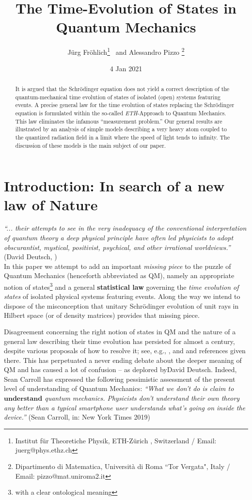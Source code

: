 \documentclass[12pt]{article}
\date{4 Jan 2021}
\author{J\"{u}rg Fr\"{o}hlich\footnote{Institut f\"ur Theoretiche Physik, ETH-Z\"urich , Switzerland / Email: juerg@phys.ethz.ch}\,\,\, and Alessandro Pizzo \footnote{Dipartimento di Matematica, Universit\`a di Roma ``Tor Vergata", Italy
/ Email: pizzo@mat.uniroma2.it}}
\title{The Time-Evolution of States in Quantum Mechanics}
\begin{document}
\maketitle


\begin{abstract}
It is argued that the Schr\"odinger equation does not yield a correct description of the quantum-mechanical time evolution of states of isolated (open) systems featuring events. A precise general law for the time evolution of states replacing the Schr\"odinger equation is formulated within the so-called \textit{ETH}-Approach to Quantum Mechanics. This law eliminates the infamous ``measurement problem.'' Our general results are illustrated by an analysis of simple models describing a very heavy atom coupled to the quantized radiation field in a limit where the speed of light tends to infinity. The discussion of these models is the main subject of our paper.
\end{abstract}

\newpage
\tableofcontents
\newpage

\section{Introduction: In search of a new law of Nature}\label{Intro}

\hspace{0.5cm} \textit{``... their attempts to see in the very inadequacy of the conventional interpretation of quantum theory a
deep physical principle have often led physicists to adopt obscurantist, mystical, positivist, psychical, and other irrational
worldviews.''} (David Deutsch, \cite{Deutsch})\\

In this paper we attempt to add an important \textit{missing piece} to the puzzle of Quantum Mechanics (henceforth
abbreviated as QM), namely an appropriate notion of states\footnote{with a clear ontological meaning} and a general {\bf{statistical law}} governing the \textit{time evolution of states} of isolated physical systems featuring events. Along the way we intend to dispose of the misconception
that unitary Schr\"odinger evolution of unit rays in Hilbert space (or of density matrices) provides that missing piece.

Disagreement concerning the right notion of states in QM and the nature of a general law describing their time evolution
has persisted for almost a century, despite various proposals of how to resolve it; see, e.g., \cite{Bohm, GRW, Everett},
and \cite{Bell, ABDZ} and references given there. This has perpetuated a never ending debate about the deeper meaning
of QM and has caused a lot of confusion -- as deplored by{David Deutsch}.
Indeed, {Sean Carroll} has expressed the following pessimistic assessment of the present level
of understanding of Quantum Mechanics: \textit{``What we don't do is claim to $\mathbf{understand}$
quantum mechanics. Physicists don't understand their own theory any better than a typical smartphone
user understands what's going on inside the device.''} (Sean Carroll, in: New York Times 2019)
\end{document}
